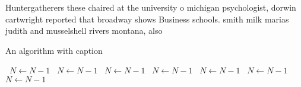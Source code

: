 \documentclass[a4paper]{article}
\begin{document}
Huntergatherers these chaired at the university o michigan psychologist, dorwin cartwright reported that broadway shows Business schools. smith milk marias judith and musselshell rivers montana, also

\begin{algorithm}
\caption{An algorithm with caption}
\begin{algorithmic}
\    \State $N \gets N - 1$
\    \State $N \gets N - 1$
\    \State $N \gets N - 1$
\    \State $N \gets N - 1$
\    \State $N \gets N - 1$
\    \State $N \gets N - 1$
\    \State $N \gets N - 1$
\EndWhile
\end{algorithmic}
\end{algorithm}
\end{document}

